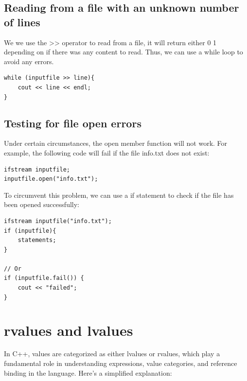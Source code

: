 \documentclass{report}
\begin{document}
    \pagebreak \bigbreak \noindent 
    \subsection{Reading from a file with an unknown number of lines}
    \bigbreak \noindent 
    We we use the >> operator to read from a file, it will return either 0 1 depending on if there was any content to read. Thus, we can use a while loop to avoid any errors.
    \bigbreak \noindent 
    \sepline
    \begin{verbatim}
while (inputfile >> line){
    cout << line << endl;
}
    \end{verbatim}
    \sepline

    \bigbreak \noindent 
    \subsection{Testing for file open errors}
    \bigbreak \noindent 
    Under certain circumstances, the open member function will not work. For example, the following code will fail if the file info.txt does not exist:
    \bigbreak \noindent 
    \sepline
    \begin{verbatim}
ifstream inputfile;
inputfile.open("info.txt");
    \end{verbatim}
    \sepline
    \bigbreak \noindent 
    To circumvent this problem, we can use a if statement to check if the file has been opened successfully:
    \bigbreak \noindent 
    \sepline
    \begin{verbatim}
ifstream inputfile("info.txt");
if (inputfile){
    statements;
}

// Or
if (inputfile.fail()) {
    cout << "failed";
}
    \end{verbatim}
    \sepline

    \pagebreak \bigbreak \noindent 
    \section{\LARGE rvalues and lvalues}
    \bigbreak \noindent 
    In C++, values are categorized as either lvalues or rvalues, which play a fundamental role in understanding expressions, value categories, and reference binding in the language.
    \bigbreak \noindent 
    Here's a simplified explanation:

    \bigbreak \noindent 
\end{document}

